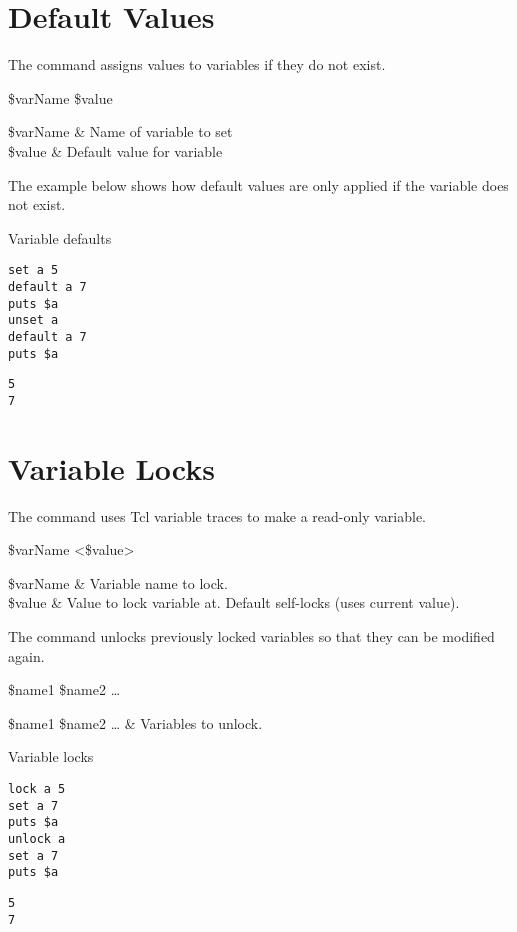 \documentclass{article}
\begin{document}
\clearpage

\section{Default Values}
The command  assigns values to variables if they do not exist.

\begin{syntax}
 \$varName \$value
\end{syntax}
\begin{args}
\$varName & Name of variable to set \\
\$value & Default value for variable
\end{args}

The example below shows how default values are only applied if the variable does not exist.

\begin{example}{Variable defaults}
\begin{lstlisting}
set a 5
default a 7
puts $a
unset a
default a 7
puts $a
\end{lstlisting}
\tcblower
\begin{lstlisting}
5
7
\end{lstlisting}
\end{example}
\clearpage
\section{Variable Locks}
The command  uses Tcl variable traces to make a read-only variable.

\begin{syntax}
 \$varName <\$value>
\end{syntax}
\begin{args}
\$varName & Variable name to lock. \\
\$value & Value to lock variable at. Default self-locks (uses current value).
\end{args}

The command  unlocks previously locked variables so that they can be modified again.

\begin{syntax}
 \$name1 \$name2 …
\end{syntax}
\begin{args}
\$name1 \$name2 … & Variables to unlock.
\end{args}

\begin{example}{Variable locks}
\begin{lstlisting}
lock a 5
set a 7
puts $a
unlock a
set a 7
puts $a
\end{lstlisting}
\tcblower
\begin{lstlisting}
5
7
\end{lstlisting}
\end{example}
\end{document}

